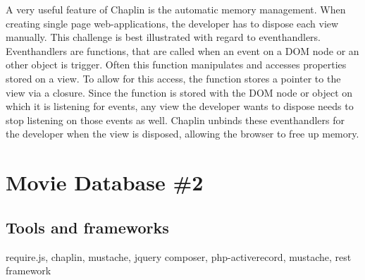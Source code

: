 \documentclass[thesis.tex]{subfiles}
\begin{document}
A very useful feature of Chaplin is the automatic memory management.
When creating single page web-applications, the developer has to dispose each
view manually. This challenge is best illustrated with regard to eventhandlers.
Eventhandlers are functions, that are called when an event on a DOM node or
an other object is trigger. Often this function manipulates and accesses
properties stored on a view. To allow for this access, the function stores a
pointer to the view via a closure. Since the function is stored with the
DOM node or object on which it is listening for events, any view the developer
wants to dispose needs to stop listening on those events as well.
Chaplin unbinds these eventhandlers for the developer when the view is disposed,
allowing the browser to free up memory.

\section{Movie Database \#2}

\subsection{Tools and frameworks}
\label{sec:mdb2-tools}
require.js, chaplin, mustache, jquery
composer, php-activerecord, mustache, rest framework
\end{document}
